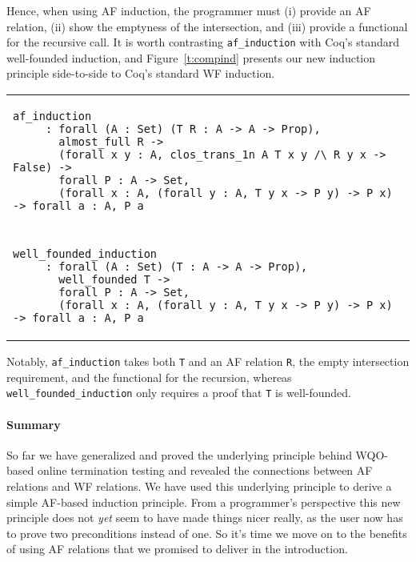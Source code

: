\documentclass{llncs}
\begin{document}
Hence, when using AF induction, the programmer must (i) provide an AF relation, (ii) show 
the emptyness of the intersection, and (iii) provide a functional for the recursive call. 
It is worth contrasting \lstinline|af_induction| with Coq's standard well-founded induction, 
and Figure~\ref{t:compind} presents our new induction principle side-to-side to Coq's standard WF 
induction.
\begin{figure*}[t]
\begin{tabular}{l}
\begin{lstlisting}
af_induction
     : forall (A : Set) (T R : A -> A -> Prop),
       almost_full R ->
       (forall x y : A, clos_trans_1n A T x y /\ R y x -> False) ->
       forall P : A -> Set,
       (forall x : A, (forall y : A, T y x -> P y) -> P x) -> forall a : A, P a
\end{lstlisting}\\ \\
\begin{lstlisting}
well_founded_induction
     : forall (A : Set) (T : A -> A -> Prop),
       well_founded T ->
       forall P : A -> Set,
       (forall x : A, (forall y : A, T y x -> P y) -> P x) -> forall a : A, P a
\end{lstlisting}
\end{tabular}
\caption{AF vs WF induction principles}\label{t:compind}
\end{figure*}
Notably, \lstinline|af_induction| takes both \lstinline|T| and an AF relation \lstinline|R|, the empty 
intersection requirement, and the functional for the recursion, whereas \lstinline|well_founded_induction| 
only requires a proof that \lstinline|T| is well-founded. 


\paragraph{Summary} So far we have generalized and proved the underlying principle behind WQO-based online
termination testing and revealed the connections between AF relations and WF relations. We have used this 
underlying principle to derive a simple AF-based induction principle. From a programmer's perspective this
new principle does not {\em yet} seem to have made things nicer really, as the user now has to prove two 
preconditions instead of one. So it's time we move on to the benefits of using AF relations that we 
promised to deliver in the introduction.
\end{document}
